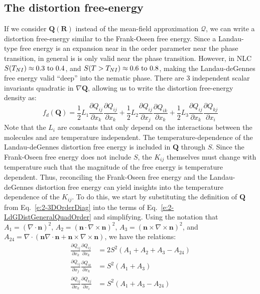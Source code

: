 \subsection{The distortion free-energy}
If we consider $\mathbf{Q}(\mathbf{R})$ instead of the mean-field approximation $\bm{\mathcal{Q}}$, we can write a distortion free-energy similar to the Frank-Oseen free energy.
Since a Landau-type free energy is an expansion near in the order parameter near the phase transition, in general is is only valid near the phase transition.
However, in NLC $S(T_{NI}) \approx 0.3 \textup{ to } 0.4$, and $S(T > T_{NI}) \approx 0.6 \textup{ to } 0.8$, making the Landau-deGennes free energy valid ``deep'' into the nematic phase.
There are 3 independent scalar invariants quadratic in $\nabla\mathbf{Q}$, allowing us to write the distortion free-energy density as:
\begin{equation}
  f_d(\mathbf{Q}) = \frac{1}{2} L_1 \frac{\partial Q_{ij}}{\partial x_k} \frac{\partial Q_{ij}}{\partial x_k}
    + \frac{1}{2} L_2 \frac{\partial Q_{ij}}{\partial x_j} \frac{\partial Q_{ik}}{\partial x_k}
    + \frac{1}{2} L_3 \frac{\partial Q_{ij}}{\partial x_k} \frac{\partial Q_{kj}}{\partial x_i}\label{e:2-LdGDistGeneralQuadOrder}
\end{equation}
Note that the $L_i$ are constants that only depend on the interactions between the molecules and are temperature independent.
The temperature-dependence of the Landau-deGennes distortion free energy is included in $\mathbf{Q}$ through $S$.
Since the Frank-Oseen free energy does not include $S$, the $K_{ij}$ themselves must change with temperature such that the magnitude  of the free energy is temperature dependent.
Thus, reconciling the Frank-Oseen free energy and the Landau-deGennes distortion free energy can yield insights into the temperature dependence of the $K_{ij}$.
To do this, we start by substituting the definition of $\mathbf{Q}$ from Eq.~\ref{e:2-3DOrderDiag} into the terms of Eq.~\ref{e:2-LdGDistGeneralQuadOrder} and simplifying. Using the notation that
    $A_1 = (\nabla \cdot \mathbf{n})^2$,
    $A_2 = (\mathbf{n} \cdot \nabla \times \mathbf{n})^2$,
    $A_3 = (\mathbf{n} \times \nabla \times \mathbf{n})^2$, and
    $A_{24} = \nabla \cdot (\mathbf{n} \nabla \cdot \mathbf{n} + \mathbf{n} \times \nabla \times \mathbf{n})$, we have the relations:
\label{e:2-LdGRelationsQuadOrder}
\begin{align}
  \frac{\partial Q_{ij}}{\partial x_k} \frac{\partial Q_{ij}}{\partial x_k} & =
    2 S^2(A_1 + A_2 + A_3 -A_{24})\tag{\theequation a} \\
  \frac{\partial Q_{ij}}{\partial x_j} \frac{\partial Q_{ik}}{\partial x_k} &=
    S^2 (A_1 + A_3)\tag{\theequation b}\\
  \frac{\partial Q_{ij}}{\partial x_k} \frac{\partial Q_{kj}}{\partial x_i} &=
    S^2 (A_1 + A_3 - A_{24})\tag{\theequation b}
\end{align}
